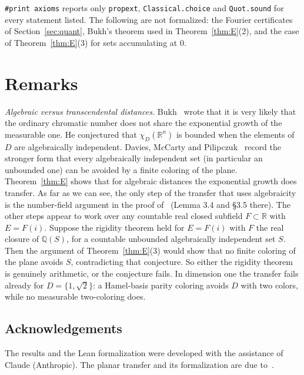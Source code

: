 \documentclass[11pt]{amsart}
\theoremstyle{definition}
\newcommand{\R}{\mathbb{R}}
\newcommand{\Q}{\mathbb{Q}}
\begin{document}
\texttt{\#print axioms} reports only \texttt{propext}, \texttt{Classical.choice} and \texttt{Quot.sound} for every statement listed. The following are not formalized: the Fourier certificates of Section~\ref{sec:quant}, Bukh's theorem used in Theorem~\ref{thm:E}(2), and the case of Theorem~\ref{thm:E}(3) for sets accumulating at $0$.

\section{Remarks}
\emph{Algebraic versus transcendental distances.} Bukh~\cite{Bukh} wrote that it is very likely that the ordinary chromatic number does not share the exponential growth of the measurable one. He conjectured that $\chi_D(\R^n)$ is bounded when the elements of $D$ are algebraically independent. Davies, McCarty and Pilipczuk~\cite[Conjecture 5.6]{DMP} record the stronger form that every algebraically independent set (in particular an unbounded one) can be avoided by a finite coloring of the plane. Theorem~\ref{thm:E} shows that for algebraic distances the exponential growth does transfer. As far as we can see, the only step of the transfer that uses algebraicity is the number-field argument in the proof of~\cite[Theorem 2.3]{OAI} (Lemma 3.4 and \S3.5 there). The other steps appear to work over any countable real closed subfield $F\subset\R$ with $E=F(i)$. Suppose the rigidity theorem held for $E=F(i)$ with $F$ the real closure of $\Q(S)$, for a countable unbounded algebraically independent set $S$. Then the argument of Theorem~\ref{thm:E}(3) would show that no finite coloring of the plane avoids $S$, contradicting that conjecture. So either the rigidity theorem is genuinely arithmetic, or the conjecture fails. In dimension one the transfer fails already for $D=\{1,\sqrt2\}$: a Hamel-basis parity coloring avoids $D$ with two colors, while no measurable two-coloring does.

\subsection*{Acknowledgements}
The results and the Lean formalization were developed with the assistance of Claude (Anthropic). The planar transfer and its formalization are due to~\cite{OAI}.
\end{document}
